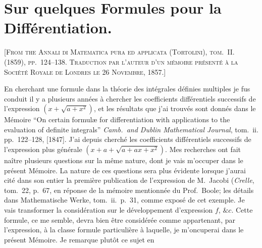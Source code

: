 \documentclass[11pt,a4paper]{article}
\begin{document}
\newpage


\setcounter{page}{134}

\section*{Sur quelques Formules pour la Différentiation.}
\label{paper:251}

\textsc{[From the Annali di Matematica pura ed applicata (Tortolini), tom.~II. (1859), pp.~124--138. Traduction par l'auteur d'un mémoire présenté à la Société Royale de Londres le 26 Novembre, 1857.]}

\medskip

En cherchant une formule dans la théorie des intégrales définies multiples je fus conduit il y a plusieurs années à chercher les coefficients différentiels successifs de l'expression $(x+\sqrt{a+x^2})$, et les résultats que j'ai trouvés sont donnés dans le Mémoire ``On certain formulæ for differentiation with applications to the evaluation of definite integrals'' \textit{Camb.~and Dublin Mathematical Journal}, tom.~ii. pp.~122--128, [1847]. J'ai depuis cherché les coefficients différentiels successifs de l'expression plus générale $(x + a + \sqrt{a + ax + x^2})$. Mes recherches ont fait naître plusieurs questions sur la même nature, dont je vais m'occuper dans le présent Mémoire. La nature de ces questions sera plus évidente lorsque j'aurai cité dans son entier la première publication de l'expression de M.~Jacobi (\textit{Crelle}, tom.~22, p.~67, en réponse de la mémoire mentionnée du Prof.~Boole; les détails dans Mathematische Werke, tom.~ii.~p.~31, comme exposé de cet exemple. Je vais transformer la considération sur le développement d'expression $f$, $\&c$. Cette formule, ce me semble, devra bien être considérée comme appartenant, par l'expression, à la classe formule particulière à laquelle, je m'oncuperai dans le présent Mémoire. Je remarque plutôt ce sujet en

\setcounter{page}{135}
\end{document}
